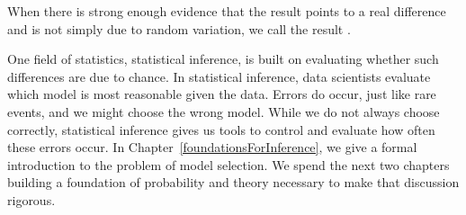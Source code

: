 When there is strong enough evidence that the result points to a real difference and is not simply due to random variation, we call the result .


One field of statistics, statistical inference, is built
on evaluating whether such differences are due to chance.
In statistical inference, data scientists evaluate which
model is most reasonable given the data.
Errors do occur, just like rare events, and we might choose
the wrong model.
While we do not always choose correctly, statistical
inference gives us tools to control and evaluate how
often these errors occur.
In Chapter~\ref{foundationsForInference},
we give a formal introduction to the problem of model
selection.
We spend the next two chapters building a foundation
of probability and theory necessary to make that
discussion rigorous.



{}


\reviewchapterheader{}

